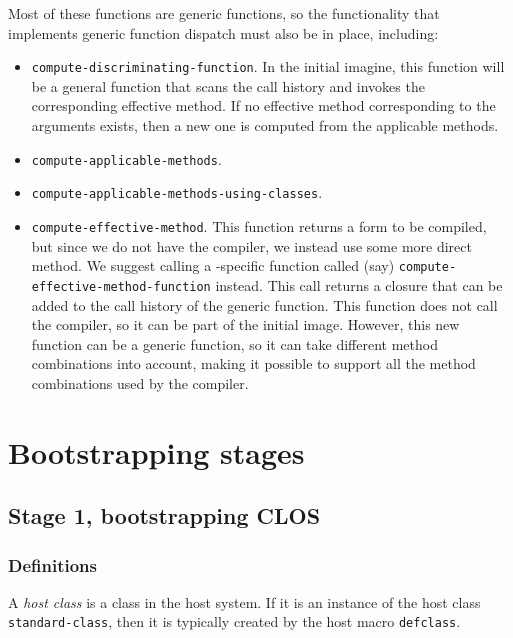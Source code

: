 Most of these functions are generic functions, so the functionality
that implements generic function dispatch must also be in place,
including:

\begin{itemize}
\item \texttt{compute-discriminating-function}.  In the initial
  imagine, this function will be a general function that scans the
  call history and invokes the corresponding effective method.  If no
  effective method corresponding to the arguments exists, then a new
  one is computed from the applicable methods.
\item \texttt{compute-applicable-methods}.
\item \texttt{compute-applicable-methods-using-classes}.
\item \texttt{compute-effective-method}.  This function returns a form
  to be compiled, but since we do not have the compiler, we instead
  use some more direct method.  We suggest calling a
  \sysname{}-specific function called (say)
  \texttt{compute-effective-method-function} instead.  This call
  returns a closure that can be added to the call history of the
  generic function.  This function does not call the compiler, so it
  can be part of the initial image.  However, this new function can be
  a generic function, so it can take different method combinations
  into account, making it possible to support all the method
  combinations used by the compiler.
\end{itemize}

\section{Bootstrapping stages}

\subsection{Stage 1, bootstrapping CLOS}

\subsubsection{Definitions}

\begin{definition}
A \emph{host class} is a class in the host system.  If it is an
instance of the host class \texttt{standard-class}, then it is
typically created by the host macro \texttt{defclass}.
\end{definition}

